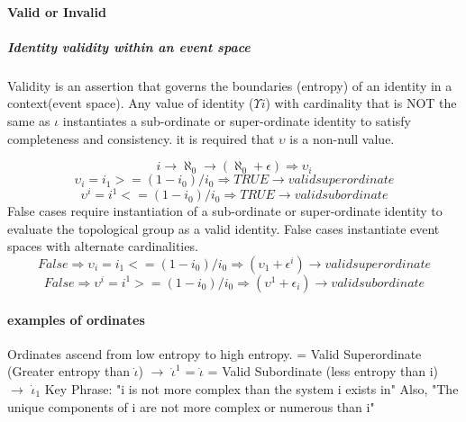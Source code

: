 \documentclass{article}
\begin{document}
\paragraph{Valid or Invalid}
		\subparagraph{Identity validity within an event space}
			Validity is an assertion that governs the boundaries (entropy) of an identity in a context(event space).  Any value of identity ($\Upsilon i$) with cardinality that is NOT the same as $\iota$ instantiates a sub-ordinate or super-ordinate identity to satisfy completeness and consistency.  it is required that $\upsilon$ is a non-null value.
		
		\begin{equation}
			i \rightarrow \aleph_0 \rightarrow (\aleph_0 + \epsilon) \Rightarrow \upsilon_i
		\end{equation}
		\begin{equation}
			\upsilon_i = i_1 >= (1-i_0)/i_0 \Rightarrow TRUE \rightarrow valid {super ordinate}
		\end{equation} 
		\begin{equation}
			\upsilon^i = i^1 <= (1-i_0)/i_0 \Rightarrow TRUE \rightarrow valid {sub ordinate}
		\end{equation}
		False cases require instantiation of a sub-ordinate or super-ordinate identity to evaluate the topological group as a valid identity.  False cases instantiate event spaces with alternate cardinalities.
		\begin{equation}
			False \Rightarrow \upsilon_i = i_1 <= (1-i_0)/i_0 \Rightarrow (\upsilon_1 + \epsilon^i) \rightarrow valid {super ordinate} 
		\end{equation}
		\begin{equation}
			False \Rightarrow \upsilon^i = i^1 >= (1-i_0)/i_0 \Rightarrow (\upsilon^1 + \epsilon_i) \rightarrow valid {sub ordinate}
		\end{equation}

		\paragraph{examples of ordinates} 
			Ordinates ascend from low entropy to high entropy.	\newline
			[010010010101] = Valid Superordinate (Greater entropy than $\dot \iota$) $\rightarrow$ $\dot \iota^1$ \newline
			[01001001] = $\dot \iota$ \newline
			[01001] = Valid Subordinate (less entropy than i) $\rightarrow$ $\dot \iota_1$ \newline
			Key Phrase: "i is not more complex than the system i exists in"  Also, "The unique components of i are not more complex or numerous than i" \newline
\end{document}
